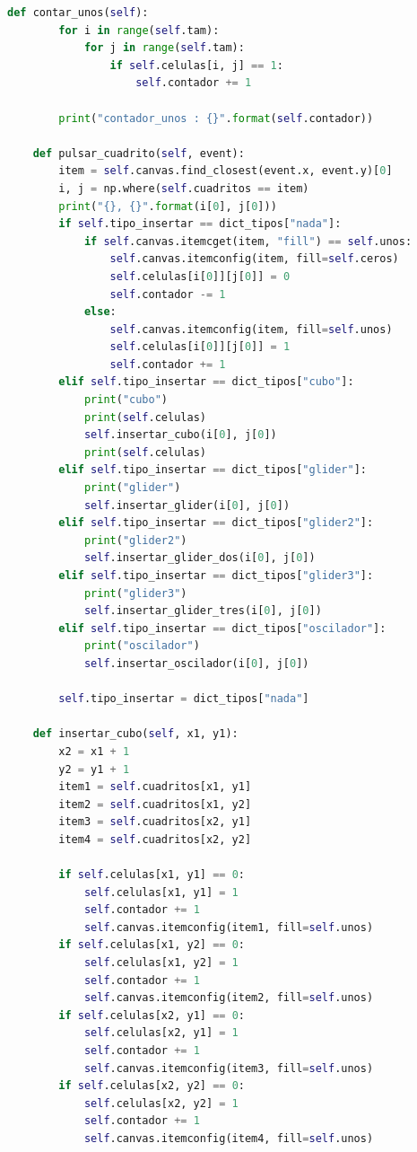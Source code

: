 \begin{lstlisting}[language=Python]
    def contar_unos(self):
        for i in range(self.tam):
            for j in range(self.tam):
                if self.celulas[i, j] == 1:
                    self.contador += 1

        print("contador_unos : {}".format(self.contador))

    def pulsar_cuadrito(self, event):
        item = self.canvas.find_closest(event.x, event.y)[0]
        i, j = np.where(self.cuadritos == item)
        print("{}, {}".format(i[0], j[0]))
        if self.tipo_insertar == dict_tipos["nada"]:
            if self.canvas.itemcget(item, "fill") == self.unos:
                self.canvas.itemconfig(item, fill=self.ceros)
                self.celulas[i[0]][j[0]] = 0
                self.contador -= 1
            else:
                self.canvas.itemconfig(item, fill=self.unos)
                self.celulas[i[0]][j[0]] = 1
                self.contador += 1
        elif self.tipo_insertar == dict_tipos["cubo"]:
            print("cubo")
            print(self.celulas)
            self.insertar_cubo(i[0], j[0])
            print(self.celulas)
        elif self.tipo_insertar == dict_tipos["glider"]:
            print("glider")
            self.insertar_glider(i[0], j[0])
        elif self.tipo_insertar == dict_tipos["glider2"]:
            print("glider2")
            self.insertar_glider_dos(i[0], j[0])
        elif self.tipo_insertar == dict_tipos["glider3"]:
            print("glider3")
            self.insertar_glider_tres(i[0], j[0])
        elif self.tipo_insertar == dict_tipos["oscilador"]:
            print("oscilador")
            self.insertar_oscilador(i[0], j[0])

        self.tipo_insertar = dict_tipos["nada"]

    def insertar_cubo(self, x1, y1):
        x2 = x1 + 1
        y2 = y1 + 1
        item1 = self.cuadritos[x1, y1]
        item2 = self.cuadritos[x1, y2]
        item3 = self.cuadritos[x2, y1]
        item4 = self.cuadritos[x2, y2]

        if self.celulas[x1, y1] == 0:
            self.celulas[x1, y1] = 1
            self.contador += 1
            self.canvas.itemconfig(item1, fill=self.unos)
        if self.celulas[x1, y2] == 0:
            self.celulas[x1, y2] = 1
            self.contador += 1
            self.canvas.itemconfig(item2, fill=self.unos)
        if self.celulas[x2, y1] == 0:
            self.celulas[x2, y1] = 1
            self.contador += 1
            self.canvas.itemconfig(item3, fill=self.unos)
        if self.celulas[x2, y2] == 0:
            self.celulas[x2, y2] = 1
            self.contador += 1
            self.canvas.itemconfig(item4, fill=self.unos)


\end{lstlisting}
